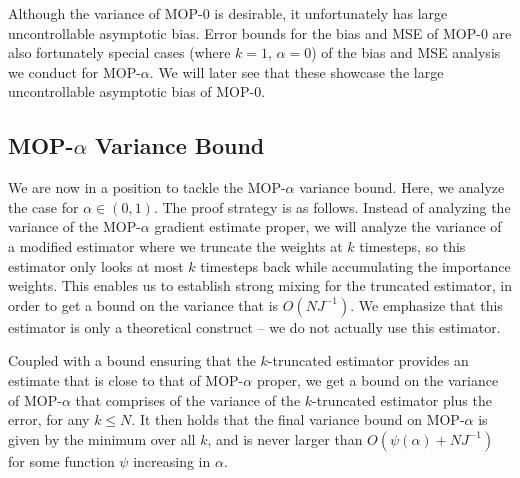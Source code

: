 Although the variance of MOP-$0$ is desirable, it unfortunately has large uncontrollable asymptotic bias. Error bounds for the bias and MSE of MOP-$0$ \cite{naesseth18} are also fortunately special cases (where $k=1$, $\alpha=0$) of the bias and MSE analysis we conduct for MOP-$\alpha$. We will later see that these showcase the large uncontrollable asymptotic bias of MOP-$0$. 

\subsection{MOP-$\alpha$ Variance Bound}

We are now in a position to tackle the MOP-$\alpha$ variance bound. Here, we analyze the case for $\alpha \in (0,1)$. The proof strategy is as follows. Instead of analyzing the variance of the MOP-$\alpha$ gradient estimate proper, we will analyze the variance of a modified estimator where we truncate the weights at $k$ timesteps, so this estimator only looks at most $k$ timesteps back while accumulating the importance weights. This enables us to establish strong mixing for the truncated estimator, in order to get a bound on the variance that is $O(NJ^{-1})$. We emphasize that this estimator is only a theoretical construct -- we do not actually use this estimator. 

Coupled with a bound ensuring that the $k$-truncated estimator provides an estimate that is close to that of MOP-$\alpha$ proper, we get a bound on the variance of MOP-$\alpha$ that comprises of the variance of the $k$-truncated estimator plus the error, for any $k \leq N$. It then holds that the final variance bound on MOP-$\alpha$ is given by the minimum over all $k$, and is never larger than $O(\psi(\alpha)+NJ^{-1})$ for some function $\psi$ increasing in $\alpha$. 



